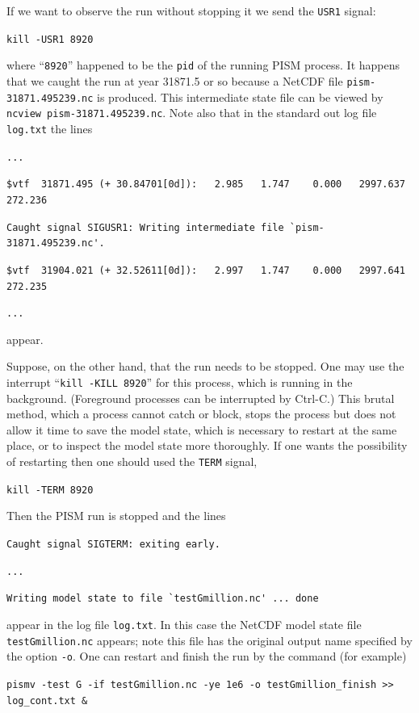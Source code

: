 \documentclass[11pt,final]{amsart}
\begin{document}
If we want to observe the run without stopping it we send the \verb|USR1| signal:

\verb|kill -USR1 8920|

\noindent where ``\verb|8920|'' happened to be the \verb|pid| of the running PISM process.  It happens that we caught the run at year 31871.5 or so because a NetCDF file \verb|pism-31871.495239.nc| is produced.  This intermediate state file can be viewed by \verb|ncview pism-31871.495239.nc|.  Note also that in the standard out log file \verb|log.txt| the lines

\verb|...|

\verb|$vtf  31871.495 (+ 30.84701[0d]):   2.985   1.747    0.000   2997.637   272.236|

\verb|Caught signal SIGUSR1: Writing intermediate file `pism-31871.495239.nc'.|

\verb|$vtf  31904.021 (+ 32.52611[0d]):   2.997   1.747    0.000   2997.641   272.235|

\verb|...|

\noindent appear.

Suppose, on the other hand, that the run needs to be stopped.  One may use the interrupt ``\verb|kill -KILL 8920|'' for this process, which is running in the background.  (Foreground processes can be interrupted by Ctrl-C.)  This brutal method, which a process cannot catch or block, stops the process but does not allow it  time to save the model state, which is necessary to restart at the same place, or to inspect the model state more thoroughly.  If one wants the possibility of restarting then one should used the \verb|TERM| signal, 

\verb|kill -TERM 8920|

\noindent Then the PISM run is stopped and the lines

\verb|Caught signal SIGTERM: exiting early.|

\verb|...|

\verb|Writing model state to file `testGmillion.nc' ... done|

\noindent appear in the log file \verb|log.txt|.  In this case the NetCDF model state file \verb|testGmillion.nc| appears; note this file has the original output name specified by the option \verb|-o|.  One can restart and finish the run by the command (for example)

\verb|pismv -test G -if testGmillion.nc -ye 1e6 -o testGmillion_finish >> log_cont.txt &|
\smallskip
\end{document}
